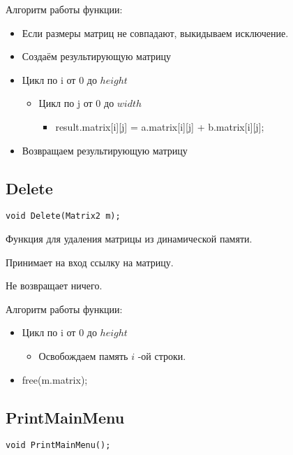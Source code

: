 Алгоритм работы функции:

\begin{itemize}
	\item Если размеры матриц не совпадают, выкидываем исключение.
	\item Создаём результирующую матрицу
	\item Цикл по i от 0 до $ height $
	\begin{itemize}
		\item Цикл по j от 0 до $ width $
		\begin{itemize}
			\item result.matrix[i][j] = a.matrix[i][j] + b.matrix[i][j];
		\end{itemize}
	\end{itemize}
	\item Возвращаем результирующую матрицу
\end{itemize}

\subsection*{Delete}

\begin{lstlisting}[label={lst:Delete}]
	void Delete(Matrix2 m);
\end{lstlisting}

Функция для удаления матрицы из динамической памяти.

Принимает на вход ссылку на матрицу.

Не возвращает ничего.

Алгоритм работы функции:

\begin{itemize}
	\item Цикл по i от 0 до $ height $
	\begin{itemize}
		\item Освобождаем память $ i $ -ой строки.
	\end{itemize}
	\item free(m.matrix);
\end{itemize}

\subsection*{PrintMainMenu}

\begin{lstlisting}[label={lst:PrintMainMenu}]
	void PrintMainMenu();
\end{lstlisting}

